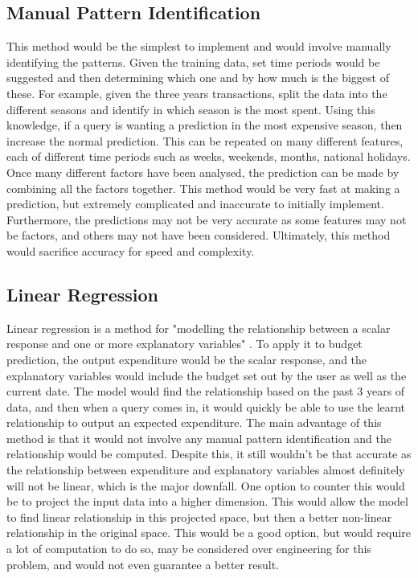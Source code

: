 \subsection{Manual Pattern Identification}
This method would be the simplest to implement and would involve manually identifying the patterns. Given the training data, set time periods would be suggested and then determining which one and by how much is the biggest of these. For example, given the three years transactions, split the data into the different seasons and identify in which season is the most spent. Using this knowledge, if a query is wanting a prediction in the most expensive season, then increase the normal prediction. This can be repeated on many different features, each of different time periods such as weeks, weekends, months, national holidays. Once many different factors have been analysed, the prediction can be made by combining all the factors together. This method would be very fast at making a prediction, but extremely complicated and inaccurate to initially implement. Furthermore, the predictions may not be very accurate as some features may not be factors, and others may not have been considered. Ultimately, this method would sacrifice accuracy for speed and complexity.

\subsection{Linear Regression}
Linear regression is a method for "modelling the relationship between a scalar response and one or more explanatory variables" \cite{LinearRegressionWiki}. To apply it to budget prediction, the output expenditure would be the scalar response, and the explanatory variables would include the budget set out by the user as well as the current date. The model would find the relationship based on the past 3 years of data, and then when a query comes in, it would quickly be able to use the learnt relationship to output an expected expenditure. The main advantage of this method is that it would not involve any manual pattern identification and the relationship would be computed. Despite this, it still wouldn't be that accurate as the relationship between expenditure and explanatory variables almost definitely will not be linear, which is the major downfall. One option to counter this would be to project the input data into a higher dimension. This would allow the model to find linear relationship in this projected space, but then a better non-linear relationship in the original space. This would be a good option, but would require a lot of computation to do so, may be considered over engineering for this problem, and would not even guarantee a better result.

